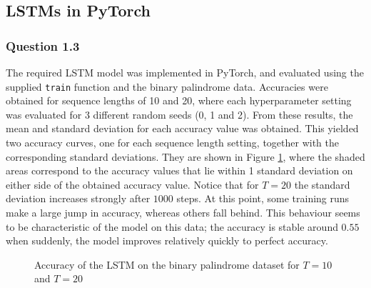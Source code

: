 \documentclass{article}
\begin{document}
\subsection{LSTMs in PyTorch}
\subsubsection*{Question 1.3}
The required LSTM model was implemented in PyTorch, and evaluated using the supplied \texttt{train} function and the binary palindrome data. Accuracies were obtained for sequence lengths of 10 and 20, where each hyperparameter setting was evaluated for 3 different random seeds (0, 1 and 2). From these results, the mean and standard deviation for each accuracy value was obtained. This yielded two accuracy curves, one for each sequence length setting, together with the corresponding standard deviations. They are shown in Figure \ref{fig:lstm}, where the shaded areas correspond to the accuracy values that lie within 1 standard deviation on either side of the obtained accuracy value. Notice that for $T = 20$ the standard deviation increases strongly after $1000$ steps. At this point, some training runs make a large jump in accuracy, whereas others fall behind. This behaviour seems to be characteristic of the model on this data; the accuracy is stable around $0.55$ when suddenly, the model improves relatively quickly to perfect accuracy.
\begin{figure}[h]
	\centering
	\caption{Accuracy of the LSTM on the binary palindrome dataset for $T=10$ and $T = 20$}
	\label{fig:lstm}
\end{figure}
\end{document}
